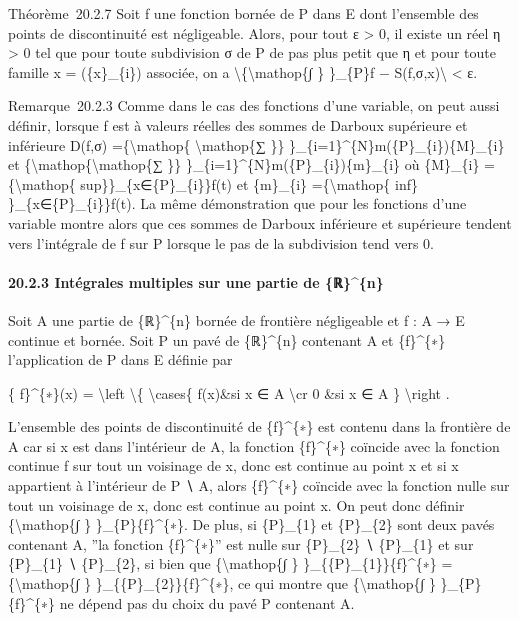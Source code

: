 \documentclass[]{article}
\begin{document}
Théorème~20.2.7 Soit f une fonction bornée de P dans E dont l'ensemble
des points de discontinuité est négligeable. Alors, pour tout ε
\textgreater{} 0, il existe un réel η \textgreater{} 0 tel que pour
toute subdivision σ de P de pas plus petit que η et pour toute famille x
= (\{x\}\_\{i\}) associée, on a
\textbackslash{}\textbar{}\{\textbackslash{}mathop\{∫ \} \}\_\{P\}f −
S(f,σ,x)\textbackslash{}\textbar{} \textless{} ε.

Remarque~20.2.3 Comme dans le cas des fonctions d'une variable, on peut
aussi définir, lorsque f est à valeurs réelles des sommes de Darboux
supérieure et inférieure D(f,σ) =\{\textbackslash{}mathop\{
\textbackslash{}mathop\{∑ \}\}
\}\_\{i=1\}\^{}\{N\}m(\{P\}\_\{i\})\{M\}\_\{i\} et
\{\textbackslash{}mathop\{\textbackslash{}mathop\{∑ \}\}
\}\_\{i=1\}\^{}\{N\}m(\{P\}\_\{i\})\{m\}\_\{i\} où \{M\}\_\{i\}
=\{\textbackslash{}mathop\{ sup\}\}\_\{x∈\{P\}\_\{i\}\}f(t) et
\{m\}\_\{i\} =\{\textbackslash{}mathop\{ inf\}
\}\_\{x∈\{P\}\_\{i\}\}f(t). La même démonstration que pour les fonctions
d'une variable montre alors que ces sommes de Darboux inférieure et
supérieure tendent vers l'intégrale de f sur P lorsque le pas de la
subdivision tend vers 0.

\paragraph{20.2.3 Intégrales multiples sur une partie de \{ℝ\}\^{}\{n\}}

Soit A une partie de \{ℝ\}\^{}\{n\} bornée de frontière négligeable et f
: A → E continue et bornée. Soit P un pavé de \{ℝ\}\^{}\{n\} contenant A
et \{f\}\^{}\{∗\} l'application de P dans E définie par

\{ f\}\^{}\{∗\}(x) = \textbackslash{}left \textbackslash{}\{
\textbackslash{}cases\{ f(x)\&si x ∈ A \textbackslash{}cr 0 \&si x ∈ A
\} \textbackslash{}right .

L'ensemble des points de discontinuité de \{f\}\^{}\{∗\} est contenu
dans la frontière de A car si x est dans l'intérieur de A, la fonction
\{f\}\^{}\{∗\} coïncide avec la fonction continue f sur tout un
voisinage de x, donc est continue au point x et si x appartient à
l'intérieur de P ∖ A, alors \{f\}\^{}\{∗\} coïncide avec la fonction
nulle sur tout un voisinage de x, donc est continue au point x. On peut
donc définir \{\textbackslash{}mathop\{∫ \} \}\_\{P\}\{f\}\^{}\{∗\}. De
plus, si \{P\}\_\{1\} et \{P\}\_\{2\} sont deux pavés contenant A, ''la
fonction \{f\}\^{}\{∗\}'' est nulle sur \{P\}\_\{2\} ∖ \{P\}\_\{1\} et
sur \{P\}\_\{1\} ∖ \{P\}\_\{2\}, si bien que \{\textbackslash{}mathop\{∫
\} \}\_\{\{P\}\_\{1\}\}\{f\}\^{}\{∗\} =\{\textbackslash{}mathop\{∫ \}
\}\_\{\{P\}\_\{2\}\}\{f\}\^{}\{∗\}, ce qui montre que
\{\textbackslash{}mathop\{∫ \} \}\_\{P\}\{f\}\^{}\{∗\} ne dépend pas du
choix du pavé P contenant A.
\end{document}

